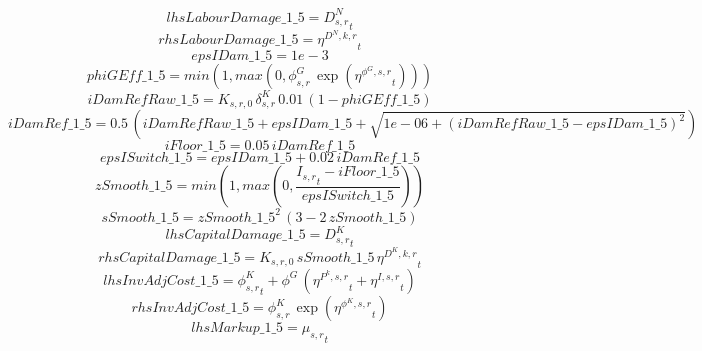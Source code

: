 \begin{dmath*}
lhsLabourDamage\_1\_5 = {{D^N_{s,r}}}_{t}
\end{dmath*}
\begin{dmath*}
rhsLabourDamage\_1\_5 = {{\eta^{D^{N},k,r}}}_{t}
\end{dmath*}
\begin{dmath*}
epsIDam\_1\_5 = 1e-3
\end{dmath*}
\begin{dmath*}
phiGEff\_1\_5 = min(1,max(0,{{\phi^{G}_{s,r}}}\, \exp\left({{\eta^{\phi^{G},s,r}}}_{t}\right)))
\end{dmath*}
\begin{dmath*}
iDamRefRaw\_1\_5 = {{K_{s,r,0}}}\, {{\delta^{K}_{s,r}}}\, 0.01\, \left(1-{phiGEff\_1\_5}\right)
\end{dmath*}
\begin{dmath*}
iDamRef\_1\_5 = 0.5\, \left({iDamRefRaw\_1\_5}+{epsIDam\_1\_5}+\sqrt{1e-06+\left({iDamRefRaw\_1\_5}-{epsIDam\_1\_5}\right)^{2}}\right)
\end{dmath*}
\begin{dmath*}
iFloor\_1\_5 = 0.05\, {iDamRef\_1\_5}
\end{dmath*}
\begin{dmath*}
epsISwitch\_1\_5 = {epsIDam\_1\_5}+0.02\, {iDamRef\_1\_5}
\end{dmath*}
\begin{dmath*}
zSmooth\_1\_5 = min(1,max(0,\frac{{{I_{s,r}}}_{t}-{iFloor\_1\_5}}{{epsISwitch\_1\_5}}))
\end{dmath*}
\begin{dmath*}
sSmooth\_1\_5 = {zSmooth\_1\_5}^{2}\, \left(3-2\, {zSmooth\_1\_5}\right)
\end{dmath*}
\begin{dmath*}
lhsCapitalDamage\_1\_5 = {{D^K_{s,r}}}_{t}
\end{dmath*}
\begin{dmath*}
rhsCapitalDamage\_1\_5 = {{K_{s,r,0}}}\, {sSmooth\_1\_5}\, {{\eta^{D^{K},k,r}}}_{t}
\end{dmath*}
\begin{dmath*}
lhsInvAdjCost\_1\_5 = {{\phi^K_{s,r}}}_{t}+{{\phi^{G}}}\, \left({{\eta^{P^k,s,r}}}_{t}+{{\eta^{I,s,r}}}_{t}\right)
\end{dmath*}
\begin{dmath*}
rhsInvAdjCost\_1\_5 = {{\phi^{K}_{s,r}}}\, \exp\left({{\eta^{\phi^{K},{s,r}}}}_{t}\right)
\end{dmath*}
\begin{dmath*}
lhsMarkup\_1\_5 = {{\mu_{s,r}}}_{t}
\end{dmath*}
